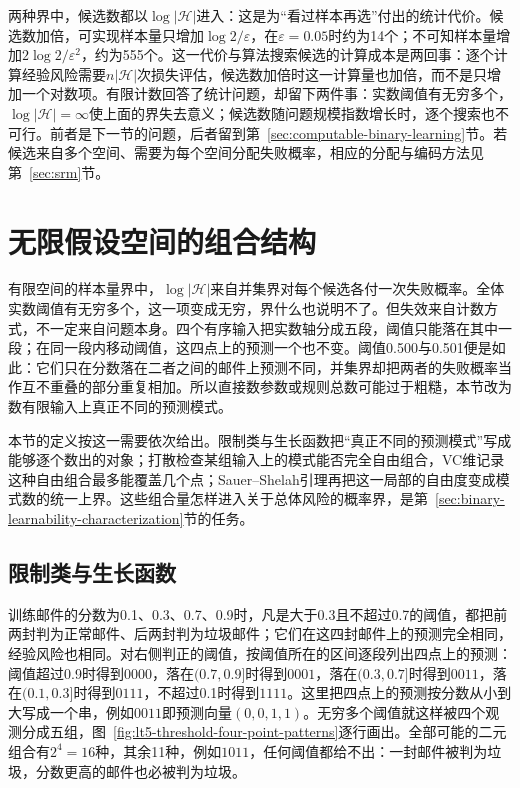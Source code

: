 两种界中，候选数都以$\log|\mathcal H|$进入：这是为“看过样本再选”付出的统计代价。候选数加倍，可实现样本量只增加$\log2/\varepsilon$，在$\varepsilon=0.05$时约为14个；不可知样本量增加$2\log2/\varepsilon^2$，约为555个。这一代价与算法搜索候选的计算成本是两回事：逐个计算经验风险需要$n|\mathcal H|$次损失评估，候选数加倍时这一计算量也加倍，而不是只增加一个对数项。有限计数回答了统计问题，却留下两件事：实数阈值有无穷多个，$\log|\mathcal H|=\infty$使上面的界失去意义；候选数随问题规模指数增长时，逐个搜索也不可行。前者是下一节的问题，后者留到第~\ref{sec:computable-binary-learning}节。若候选来自多个空间、需要为每个空间分配失败概率，相应的分配与编码方法见第~\ref{sec:srm}节。

\section{无限假设空间的组合结构}
\label{sec:binary-infinite-class}
\label{sec:comb-label-family-capacity}

有限空间的样本量界中，$\log|\mathcal H|$来自并集界对每个候选各付一次失败概率。全体实数阈值有无穷多个，这一项变成无穷，界什么也说明不了。但失效来自计数方式，不一定来自问题本身。四个有序输入把实数轴分成五段，阈值只能落在其中一段；在同一段内移动阈值，这四点上的预测一个也不变。阈值0.500与0.501便是如此：它们只在分数落在二者之间的邮件上预测不同，并集界却把两者的失败概率当作互不重叠的部分重复相加。所以直接数参数或规则总数可能过于粗糙，本节改为数有限输入上真正不同的预测模式。

本节的定义按这一需要依次给出。限制类与生长函数把“真正不同的预测模式”写成能够逐个数出的对象；打散检查某组输入上的模式能否完全自由组合，VC维记录这种自由组合最多能覆盖几个点；Sauer--Shelah引理再把这一局部的自由度变成模式数的统一上界。这些组合量怎样进入关于总体风险的概率界，是第~\ref{sec:binary-learnability-characterization}节的任务。

\subsection{限制类与生长函数}
\label{sec:comb-binary-restrictions}

训练邮件的分数为0.1、0.3、0.7、0.9时，凡是大于0.3且不超过0.7的阈值，都把前两封判为正常邮件、后两封判为垃圾邮件；它们在这四封邮件上的预测完全相同，经验风险也相同。对右侧判正的阈值，按阈值所在的区间逐段列出四点上的预测：阈值超过0.9时得到$0000$，落在$(0.7,0.9]$时得到$0001$，落在$(0.3,0.7]$时得到$0011$，落在$(0.1,0.3]$时得到$0111$，不超过0.1时得到$1111$。这里把四点上的预测按分数从小到大写成一个串，例如$0011$即预测向量$(0,0,1,1)$。无穷多个阈值就这样被四个观测分成五组，图~\ref{fig:lt5-threshold-four-point-patterns}逐行画出。全部可能的二元组合有$2^4=16$种，其余11种，例如$1011$，任何阈值都给不出：一封邮件被判为垃圾，分数更高的邮件也必被判为垃圾。


